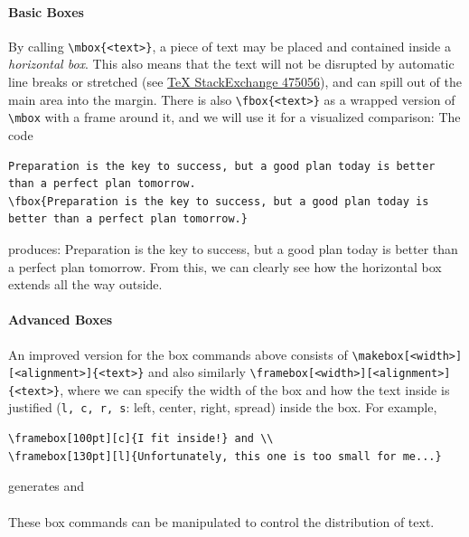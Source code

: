 \paragraph{Basic Boxes}
By calling \texttt{\textbackslash mbox\{<text>\}}, a piece of text may be placed and contained inside a \textit{horizontal box}. This also means that the text will not be disrupted by automatic line breaks or stretched (see \href{https://tex.stackexchange.com/questions/475056/hbox-mbox-difference-what-they-do}{{\TeX{} StackExchange 475056}}), and can spill out of the main area into the margin. There is also \texttt{\textbackslash fbox\{<text>\}} as a wrapped version of \texttt{\textbackslash mbox} with a frame around it, and we will use it for a visualized comparison: The code
\begin{lstlisting}
Preparation is the key to success, but a good plan today is better than a perfect plan tomorrow.
\fbox{Preparation is the key to success, but a good plan today is better than a perfect plan tomorrow.}
\end{lstlisting}
produces: Preparation is the key to success, but a good plan today is better than a perfect plan tomorrow.
From this, we can clearly see how the horizontal box extends all the way outside.

\paragraph{Advanced Boxes}
An improved version for the box commands above consists of \texttt{\textbackslash makebox[<width>][<alignment>]\{<text>\}} and also similarly \texttt{\textbackslash framebox[<width>][<alignment>]\{<text>\}}, where we can specify the width of the box and how the text inside is justified (\verb|l, c, r, s|: left, center, right, spread) inside the box. For example,
\begin{lstlisting}
\framebox[100pt][c]{I fit inside!} and \\
\framebox[130pt][l]{Unfortunately, this one is too small for me...}
\end{lstlisting}
generates  and \\
 \\
These box commands can be manipulated to control the distribution of text.

